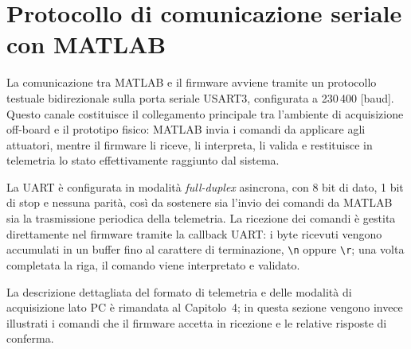 \documentclass[11pt]{report}
\begin{document}
\section{Protocollo di comunicazione seriale con MATLAB}
La comunicazione tra MATLAB e il firmware avviene tramite un protocollo testuale bidirezionale sulla porta seriale USART3, configurata a 230\,400 [baud]. Questo canale costituisce il collegamento principale tra l'ambiente di acquisizione off-board e il prototipo fisico: MATLAB invia i comandi da applicare agli attuatori, mentre il firmware li riceve, li interpreta, li valida e restituisce in telemetria lo stato effettivamente raggiunto dal sistema.

La UART è configurata in modalità \textit{full-duplex} asincrona, con 8 bit di dato, 1 bit di stop e nessuna parità, così da sostenere sia l'invio dei comandi da MATLAB sia la trasmissione periodica della telemetria. La ricezione dei comandi è gestita direttamente nel firmware tramite la callback UART: i byte ricevuti vengono accumulati in un buffer fino al carattere di terminazione, \texttt{\textbackslash n} oppure \texttt{\textbackslash r}; una volta completata la riga, il comando viene interpretato e validato.

La descrizione dettagliata del formato di telemetria e delle modalità di acquisizione lato PC è rimandata al Capitolo~4; in questa sezione vengono invece illustrati i comandi che il firmware accetta in ricezione e le relative risposte di conferma.
\end{document}
